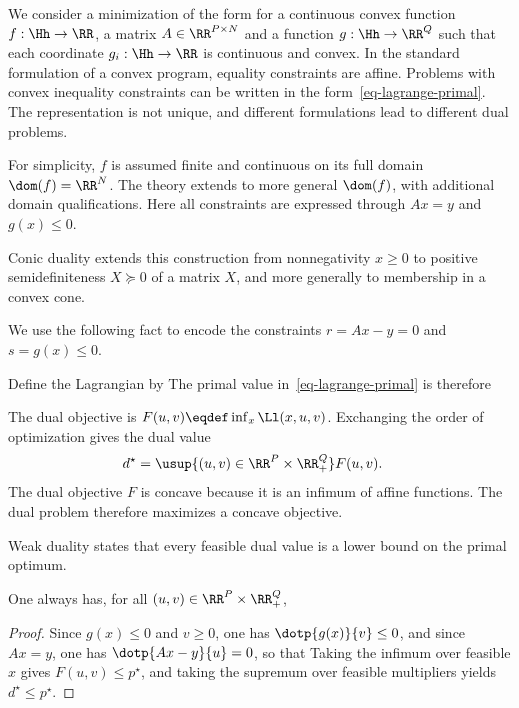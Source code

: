 We consider a minimization of the form
for a continuous convex function $f : \Hh \rightarrow \RR$, a matrix $A \in \RR^{P \times N}$ and a function $g : \Hh \rightarrow \RR^Q$ such that each coordinate $g_i : \Hh \rightarrow \RR$ is continuous and convex.
%
In the standard formulation of a convex program, equality constraints are affine.
%
Problems with convex inequality constraints can be written in the form~\eqref{eq-lagrange-primal}. The representation is not unique, and different formulations lead to different dual problems.

For simplicity, $f$ is assumed finite and continuous on its full domain $\dom(f)=\RR^N$.
%
The theory extends to more general $\dom(f)$, with additional domain qualifications. Here all constraints are expressed through $Ax=y$ and $g(x) \leq 0$.


Conic duality extends this construction from nonnegativity $x \geq 0$ to positive semidefiniteness $X \succeq 0$ of a matrix $X$, and more generally to membership in a convex cone.

We use the following fact
to encode the constraints $r=Ax-y=0$ and $s=g(x) \leq 0$.

Define the Lagrangian by
The primal value in~\eqref{eq-lagrange-primal} is therefore

The dual objective is $F(u,v)\eqdef\inf_x\Ll(x,u,v)$. Exchanging the order of optimization gives the dual value
\begin{align}\label{eq-lagrange-dual}
	d^\star &= \usup{(u,v) \in \RR^P \times \RR_+^Q } F(u,v).
\end{align}
The dual objective $F$ is concave because it is an infimum of affine functions. The dual problem therefore maximizes a concave objective.


Weak duality states that every feasible dual value is a lower bound on the primal optimum.

\begin{prop}
	One always has, for all $(u,v) \in \RR^P \times \RR_+^Q$, %
\end{prop}
\begin{proof}
	Since $g(x) \leq 0 $ and $v \geq 0$, one has $\dotp{g(x)}{v} \leq 0$, and since $Ax=y$, one has $\dotp{Ax-y}{u}=0$, so that 
	Taking the infimum over feasible $x$ gives $F(u,v)\leq p^\star$, and taking the supremum over feasible multipliers yields $d^\star\leq p^\star$.
\end{proof}

